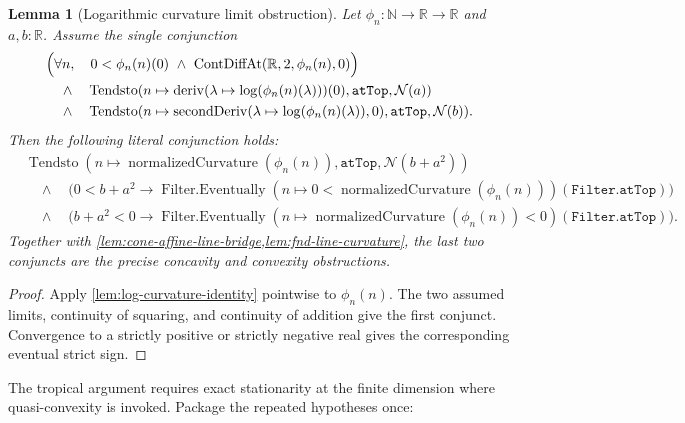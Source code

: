 \documentclass[9pt]{extarticle}
\newtheorem{lemma}{Lemma}[section]
\theoremstyle{definition}
\theoremstyle{remark}
\newcommand{\R}{\mathbb R}
\newcommand{\N}{\mathbb N}
\begin{document}
\begin{lemma}[Logarithmic curvature limit obstruction]
\label{lem:log-curvature-obstruction}
Let $\phi_n:\N\to\R\to\R$ and $a,b:\R$.  Assume the single conjunction
\begin{align*}
 &\Bigl(\forall n,\quad0<\phi_n(n)(0)\ \wedge\
   \operatorname{ContDiffAt}(\R,2,\phi_n(n),0)\Bigr)\\
 &\quad\wedge\quad\operatorname{Tendsto}
  (n\mapsto\operatorname{deriv}
    (\lambda\mapsto\log(\phi_n(n)(\lambda)))(0),
   \texttt{atTop},\mathcal N(a))\\
 &\quad\wedge\quad\operatorname{Tendsto}
  (n\mapsto\operatorname{secondDeriv}
    (\lambda\mapsto\log(\phi_n(n)(\lambda)),0),
   \texttt{atTop},\mathcal N(b)).
\end{align*}
Then the following literal conjunction holds:
\begin{align*}
 &\operatorname{Tendsto}
  (n\mapsto\operatorname{normalizedCurvature}(\phi_n(n)),
   \texttt{atTop},\mathcal N(b+a^2))\\
 &\quad\wedge\quad
 \bigl(0<b+a^2\to
   \operatorname{Filter.Eventually}
    (n\mapsto 0<\operatorname{normalizedCurvature}(\phi_n(n)))
    (\texttt{Filter.atTop})\bigr)\\
 &\quad\wedge\quad
 \bigl(b+a^2<0\to
   \operatorname{Filter.Eventually}
    (n\mapsto\operatorname{normalizedCurvature}(\phi_n(n))<0)
    (\texttt{Filter.atTop})\bigr).
\end{align*}
Together with \cref{lem:cone-affine-line-bridge,lem:fnd-line-curvature},
the last two conjuncts are the precise concavity and convexity obstructions.
\end{lemma}

\begin{proof}
Apply \cref{lem:log-curvature-identity} pointwise to $\phi_n(n)$.  The two
assumed limits, continuity of squaring,
and continuity of addition give the first conjunct.  Convergence to a
strictly positive or strictly negative real gives the corresponding
eventual strict sign.
\end{proof}

The tropical argument requires exact stationarity at the finite dimension
where quasi-convexity is invoked.  Package the repeated hypotheses once:
\end{document}
